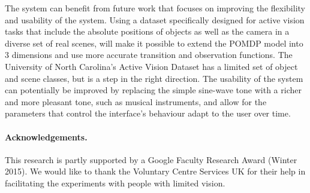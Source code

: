 \documentclass[runningheads]{llncs}
\DeclareRobustCommand{\tofix}[1]{{\sethlcolor{yellow}\hl{[#1]}}}
\begin{document}
The system can benefit from future work that focuses on improving the flexibility and usability of the system. 
Using a dataset specifically designed for active vision tasks that include the absolute positions of objects as well as the camera in a diverse set of real scenes, will make it possible to extend the POMDP model into 3 dimensions and use more accurate transition and observation functions.
The University of North Carolina's Active Vision Dataset\cite{active2017dataset} has a limited set of object and scene classes, but is a step in the right direction.
The usability of the system can potentially be improved by replacing the simple sine-wave tone with a richer and more pleasant tone, such as musical instruments, and allow for the parameters that control the interface's behaviour adapt to the user over time.  


\paragraph{{\bf Acknowledgements.}}\label{sec:acknowledge}
This research is partly supported by a Google Faculty Research Award (Winter 2015).
We would like to thank the Voluntary Centre Services UK for their help in facilitating the experiments with people with limited vision. 



\end{document}
